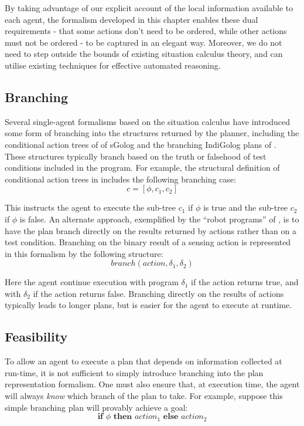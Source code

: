 By taking advantage of our explicit account of the local information
available to each agent, the formalism developed in this chapter enables
these dual requirements - that some actions don't need to be ordered,
while other actions must not be ordered - to be captured in an elegant
way. Moreover, we do not need to step outside the bounds of existing
situation calculus theory, and can utilise existing techniques for
effective automated reasoning.


\subsection{Branching}

Several single-agent formalisms based on the situation calculus have
introduced some form of branching into the structures returned by
the planner, including the conditional action trees of of sGolog \citep{lakemeyer99golog_cats}
and the branching IndiGolog plans of \citep{giacomo04sem_delib_indigolog}.
These structures typically branch based on the truth or falsehood
of test conditions included in the program. For example, the structural
definition of conditional action trees in \citep{lakemeyer99golog_cats}
includes the following branching case:\[
c=[\phi,c_{1},c_{2}]\]


This instructs the agent to execute the sub-tree $c_{1}$ if $\phi$
is true and the sub-tree $c_{2}$ if $\phi$ is false. An alternate
approach, exemplified by the {}``robot programs'' of \citep{levesque98what_robots_can_do},
is to have the plan branch directly on the results returned by actions
rather than on a test condition. Branching on the binary result of
a sensing action is represented in this formalism by the following
structure:\[
branch(action,\delta_{1},\delta_{2})\]


Here the agent continue execution with program $\delta_{1}$ if the
action returns true, and with $\delta_{2}$ if the action returns
false. Branching directly on the results of actions typically leads
to longer plans, but is easier for the agent to execute at runtime.


\subsection{Feasibility\label{sec:JointExec:BG:Feasibility}}

To allow an agent to execute a plan that depends on information collected
at run-time, it is not sufficient to simply introduce branching into
the plan representation formalism. One must also ensure that, at execution
time, the agent will always \emph{know} which branch of the plan to
take. For example, suppose this simple branching plan will provably
achieve a goal:\[
\mathbf{if}\,\,\phi\,\,\mathbf{then}\,\, action_{1}\,\,\mathbf{else\,}\, action_{2}\]


